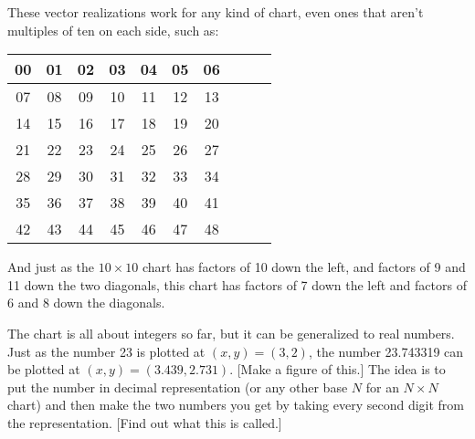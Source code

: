 \documentclass[12pt]{article}
\newcommand{\tablesize}{\footnotesize\sffamily}
\begin{document}
These vector realizations work for any kind of chart, even ones that
aren't multiples of ten on each side, such as:
\begin{center}\tablesize
\begin{tabular}{|c|c|c|c|c|c|c|c|c|c|}
\hline
 00 & 01 & 02 & 03 & 04 & 05 & 06 \\ \hline
 07 & 08 & 09 & 10 & 11 & 12 & 13 \\ \hline
 14 & 15 & 16 & 17 & 18 & 19 & 20 \\ \hline
 21 & 22 & 23 & 24 & 25 & 26 & 27 \\ \hline
 28 & 29 & 30 & 31 & 32 & 33 & 34 \\ \hline
 35 & 36 & 37 & 38 & 39 & 40 & 41 \\ \hline
 42 & 43 & 44 & 45 & 46 & 47 & 48 \\ \hline
\end{tabular}
\end{center}
And just as the $10\times 10$ chart has factors of 10 down the left,
and factors of 9 and 11 down the two diagonals, this chart has factors
of 7 down the left and factors of 6 and 8 down the diagonals.

The chart is all about integers so far, but it can be generalized to
real numbers.  Just as the number 23 is plotted at $(x,y) = (3,2)$,
the number 23.743319 can be plotted at $(x,y) = (3.439, 2.731)$.
[Make a figure of this.]  The idea is to put the number in decimal
representation (or any other base $N$ for an $N\times N$ chart) and
then make the two numbers you get by taking every second digit from
the representation.  [Find out what this is called.]
\end{document}
